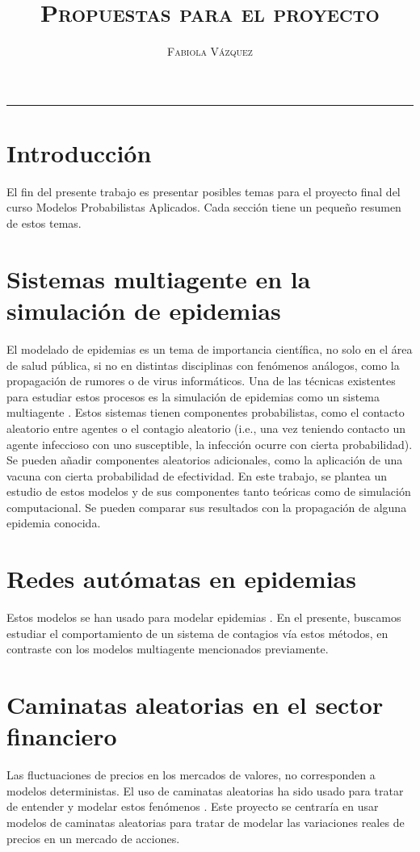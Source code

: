 \documentclass[12pt,letterpaper]{article}
\title{\textsc{Propuestas para el proyecto}}
\author{\textsc{Fabiola Vázquez}}
\begin{document}
\maketitle
\hrule 
\section{Introducción}
El fin del presente trabajo es presentar posibles temas para el proyecto final del curso Modelos Probabilistas Aplicados. Cada sección tiene un pequeño resumen de estos temas.

\section{Sistemas multiagente en la simulación de epidemias}
El modelado de epidemias es un tema de importancia científica, no solo en el área de salud pública, si no en distintas disciplinas con fenómenos análogos, como la propagación de rumores o de virus informáticos. Una de las técnicas existentes para estudiar estos procesos es la simulación de epidemias como un sistema multiagente \cite{multiagent}.  Estos sistemas tienen componentes probabilistas, como el contacto aleatorio entre agentes o el contagio aleatorio (i.e., una vez teniendo contacto un agente infeccioso con uno susceptible, la infección ocurre con cierta probabilidad). Se pueden añadir componentes aleatorios adicionales, como la aplicación de una vacuna con cierta probabilidad de efectividad. En este trabajo, se plantea un estudio de estos modelos y de sus componentes tanto teóricas como de simulación computacional. Se pueden comparar sus resultados con la propagación de alguna epidemia conocida.

\section{Redes autómatas en epidemias}
Estos modelos se han usado para modelar epidemias \cite{Boccara_1994}. En el presente, buscamos estudiar el comportamiento de un sistema de contagios vía estos métodos, en contraste con los modelos multiagente mencionados previamente.

\section{Caminatas aleatorias en el sector financiero}
Las fluctuaciones de precios en los mercados de valores, no corresponden a modelos deterministas. El uso de caminatas aleatorias ha sido usado para tratar de entender y modelar estos fenómenos \cite{randomwalks}. Este proyecto se centraría en usar modelos de caminatas aleatorias para tratar de modelar las variaciones reales de precios en un mercado de acciones.
\end{document}
